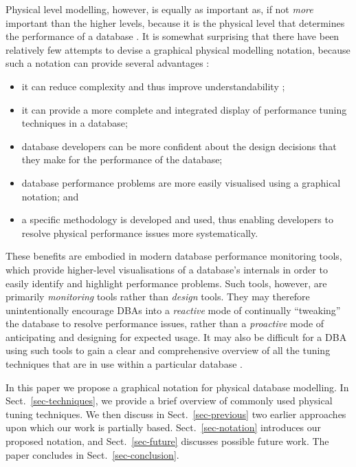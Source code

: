 \documentclass{llncs}
\begin{document}
Physical level modelling, however, is equally as important as, if not
\emph{more} important than the higher levels, because it is the physical
level that determines the performance of a database \cite{BeDa-P-2003}.
It is somewhat surprising that there have been relatively few attempts
to devise a graphical physical modelling notation, because such a
notation can provide several advantages
\cite{Conn-TM-2002,BeDa-P-1992-PDD,Will-J-1992}:
\begin{itemize}

	\item it can reduce complexity and thus improve understandability
	\cite{Tuft-ER-1997};

	\item it can provide a more complete and integrated display of
	performance tuning techniques in a database;

	\item database developers can be more confident about the design
	decisions that they make for the performance of the database;

	\item database performance problems are more easily visualised
	using a graphical notation; and

	\item a specific methodology is developed and used, thus enabling
	developers to resolve physical performance issues more
	systematically.

\end{itemize}

These benefits are embodied in modern database performance monitoring
tools, which provide higher-level visualisations of a database's
internals in order to easily identify and highlight performance
problems. Such tools, however, are primarily \emph{monitoring} tools
rather than \emph{design} tools. They may therefore unintentionally
encourage DBAs into a \emph{reactive} mode of continually ``tweaking''
the database to resolve performance issues, rather than a
\emph{proactive} mode of anticipating and designing for expected usage.
It may also be difficult for a DBA using such tools to gain a clear and
comprehensive overview of all the tuning techniques that are in use
within a particular database \cite{Core-MJ-1997-OracleDW}.

In this paper we propose a graphical notation for physical database
modelling. In Sect.~\ref{sec-techniques}, we provide a brief overview of
commonly used physical tuning techniques. We then discuss in
Sect.~\ref{sec-previous} two earlier approaches upon which our work is
partially based. Sect.~\ref{sec-notation} introduces our proposed
notation, and Sect.~\ref{sec-future} discusses possible future work. The
paper concludes in Sect.~\ref{sec-conclusion}.
\end{document}
